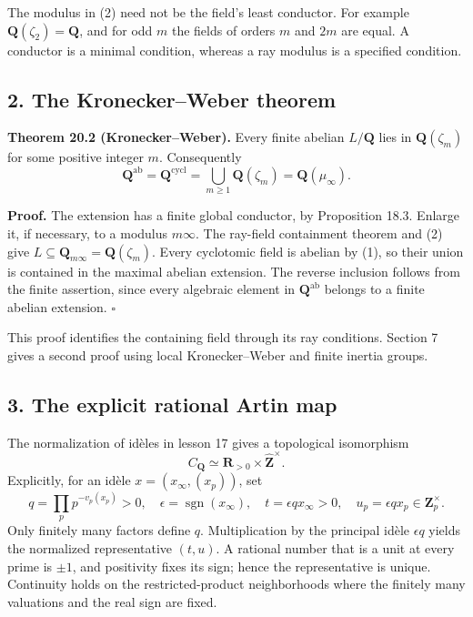\documentclass[11pt,a4paper]{article}
\begin{document}
The modulus in (2) need not be the field's least conductor. For example
\(\mathbf Q(\zeta_2)=\mathbf Q\), and for odd \(m\) the fields of orders
\(m\) and \(2m\) are equal. A conductor is a minimal condition, whereas
a ray modulus is a specified condition.

\subsection{2. The Kronecker--Weber
theorem}\label{the-kroneckerweber-theorem}

\textbf{Theorem 20.2 (Kronecker--Weber).} Every finite abelian
\(L/\mathbf Q\) lies in \(\mathbf Q(\zeta_m)\) for some positive integer
\(m\). Consequently \[
\mathbf Q^{\mathrm{ab}}=\mathbf Q^{\mathrm{cycl}}
=\bigcup_{m\geq1}\mathbf Q(\zeta_m)=\mathbf Q(\mu_\infty).
\tag{3}
\]

\textbf{Proof.} The extension has a finite global conductor, by
Proposition 18.3. Enlarge it, if necessary, to a modulus \(m\infty\).
The ray-field containment theorem and (2) give
\(L\subseteq\mathbf Q_{m\infty}=\mathbf Q(\zeta_m)\). Every cyclotomic
field is abelian by (1), so their union is contained in the maximal
abelian extension. The reverse inclusion follows from the finite
assertion, since every algebraic element in \(\mathbf Q^{\mathrm{ab}}\)
belongs to a finite abelian extension. \(\square\)

This proof identifies the containing field through its ray conditions.
Section 7 gives a second proof using local Kronecker--Weber and finite
inertia groups.

\subsection{3. The explicit rational Artin
map}\label{the-explicit-rational-artin-map}

The normalization of idèles in lesson 17 gives a topological isomorphism
\[
C_{\mathbf Q}\simeq\mathbf R_{>0}\times\widehat{\mathbf Z}^{\times}.
\tag{4}
\] Explicitly, for an idèle \(x=(x_\infty,(x_p))\), set \[
q=\prod_p p^{-v_p(x_p)}>0,\quad
\epsilon=\operatorname{sgn}(x_\infty),\quad
t=\epsilon qx_\infty>0,\quad u_p=\epsilon qx_p\in\mathbf Z_p^\times.
\tag{5}
\] Only finitely many factors define \(q\). Multiplication by the
principal idèle \(\epsilon q\) yields the normalized representative
\((t,u)\). A rational number that is a unit at every prime is \(\pm1\),
and positivity fixes its sign; hence the representative is unique.
Continuity holds on the restricted-product neighborhoods where the
finitely many valuations and the real sign are fixed.
\end{document}
